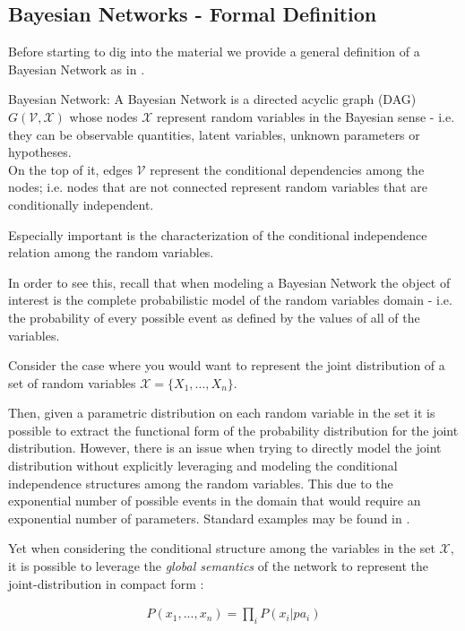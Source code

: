 \documentclass[11pt]{article}
\begin{document}
\begin{article}
\subsection{Bayesian Networks - Formal Definition}
\label{sec:org52c2c28}
Before starting to dig into the material we provide a general
definition of a Bayesian Network as in \cite{pearl2011bayesian}.

\begin{definition}
Bayesian Network: A Bayesian Network is a directed acyclic graph (DAG) $G(\mathscr{V}, \mathscr{X})$
whose nodes $\mathscr{X}$ represent random variables in the Bayesian sense - i.e. they can be observable
quantities, latent variables, unknown parameters or hypotheses. \\
On the top of it, edges $\mathscr{V}$ represent the conditional dependencies among the nodes; i.e. nodes that
are not connected represent random variables that are conditionally independent.
\end{definition}

Especially important is the characterization of the conditional
independence relation among the random variables.

In order to see this, recall that when modeling a Bayesian Network
the object of interest is the complete probabilistic model of the
random variables domain - i.e. the probability of every possible
event as defined by the values of all of the variables.

Consider the case where you would want to represent the joint
distribution of a set of random variables \(\mathscr{X} = \{X_1, ...,
   X_n\}\).

Then, given a parametric distribution on each random variable in
the set it is possible to extract the functional form of the
probability distribution for the joint distribution. However, there
is an issue when trying to directly model the joint distribution
without explicitly leveraging and modeling the conditional
independence structures among the random variables. This due to the
exponential number of possible events in the domain that would
require an exponential number of parameters. Standard examples may
be found in \cite{koller2009probabilistic}.

Yet when considering the conditional structure among the variables
in the set \(\mathscr{X}\), it is possible to leverage the \emph{global
semantics} of the network to represent the joint-distribution in
compact form \cite{pearl2011bayesian}:

\begin{align*} 
P (x_1, ..., x_n) = \prod_i P(x_i | pa_i)
\end{align*}


\end{article}
\end{document}
